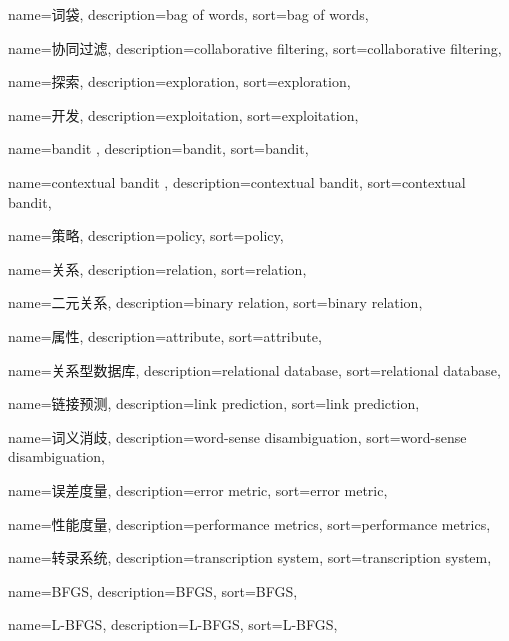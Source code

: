 {
  name=词袋,
  description={bag of words},
  sort={bag of words},
}

{
  name=协同过滤,
  description={collaborative filtering},
  sort={collaborative filtering},
}

{
  name=探索,
  description={exploration},
  sort={exploration},
}

{
  name=开发,
  description={exploitation},
  sort={exploitation},
}

{
  name=bandit ,
  description={bandit},
  sort={bandit},
}

{
  name=contextual bandit ,
  description={contextual bandit},
  sort={contextual bandit},
}

{
  name=策略,
  description={policy},
  sort={policy},
}

{
  name=关系,
  description={relation},
  sort={relation},
}

{
  name=二元关系,
  description={binary relation},
  sort={binary relation},
}

{
  name=属性,
  description={attribute},
  sort={attribute},
}

{
  name=关系型数据库,
  description={relational database},
  sort={relational database},
}

{
  name=链接预测,
  description={link prediction},
  sort={link prediction},
}

{
  name=词义消歧,
  description={word-sense disambiguation},
  sort={word-sense disambiguation},
}

{
  name=误差度量,
  description={error metric},
  sort={error metric},
}

{
  name=性能度量,
  description={performance metrics},
  sort={performance metrics},
}

{
  name=转录系统,
  description={transcription system},
  sort={transcription system},
}

{
  name=BFGS,
  description={BFGS},
  sort={BFGS},
}

{
  name=L-BFGS,
  description={L-BFGS},
  sort={L-BFGS},
}

